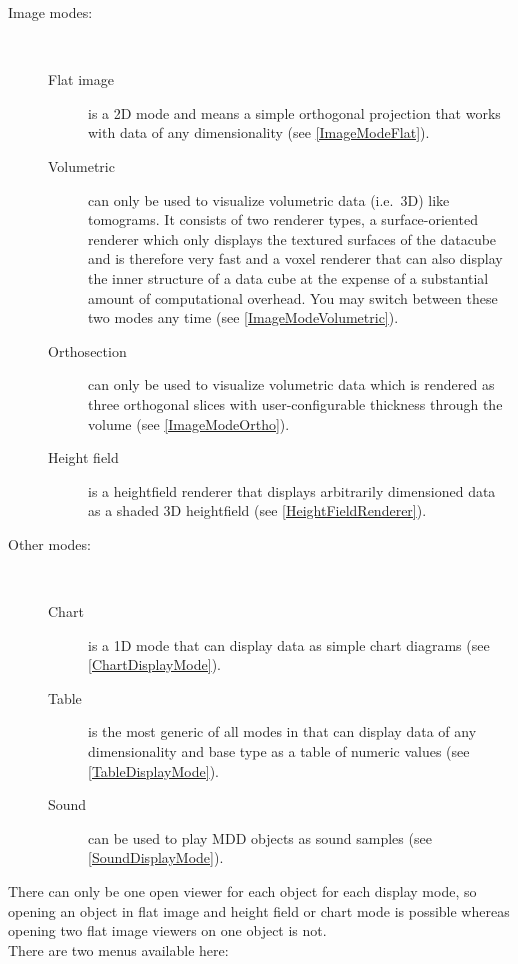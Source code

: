 \documentclass[11pt]{article}
\begin{document}
\begin{description}

\item[Image modes:]\ \\
\begin{description}
\item[Flat image] is a 2D mode and means a simple orthogonal projection that works
with data of any dimensionality (see \ref{ImageModeFlat}).
\item[Volumetric] can only be used to visualize volumetric data (i.e.\ 3D) like tomograms.
It consists of two renderer types, a surface-oriented renderer which only displays the
textured surfaces of the data\-cube and is therefore very fast and a voxel renderer that
can also display the inner structure of a data cube at the expense of a substantial amount
of computational overhead. You may switch between these two modes any time (see
\ref{ImageModeVolumetric}).
\item[Orthosection] can only be used to visualize volumetric data which is rendered
as three orthogonal slices with user-configurable thickness  through the volume
(see \ref{ImageModeOrtho}).
\item[Height field] is a heightfield renderer that displays arbitrarily dimensioned data as a
shaded 3D heightfield (see \ref{HeightFieldRenderer}).
\end{description}

\item[Other modes:]\ \\
\begin{description}
\item[Chart] is a 1D mode that can display data as simple chart diagrams (see
\ref{ChartDisplayMode}).
\item[Table] is the most generic of all modes in that can display data of any
dimensionality and base type as a table of numeric values (see \ref{TableDisplayMode}).
\item[Sound] can be used to play MDD objects as sound samples (see \ref{SoundDisplayMode}).
\end{description}

\end{description}

There can only be one open viewer for each object for each display mode, so opening an
object in flat image and height field or chart mode is possible whereas opening two flat
image viewers on one object is not.\\
There are two menus available here:\\
\end{document}
